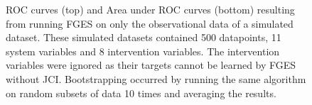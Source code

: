 \documentclass[a4paper,pdf]{article}
\begin{document}
\begin{figure}[!ht]
    \centering   
    \renewcommand{\arraystretch}{2}
    \setlength{\tabcolsep}{7pt}
    \caption{ROC curves (top) and Area under ROC curves (bottom) resulting from running FGES on only the observational data of a simulated dataset. These simulated datasets contained 500 datapoints, 11 system variables and 8 intervention variables. The intervention variables were ignored as their targets cannot be learned by FGES without JCI. Bootstrapping occurred by running the same algorithm on random subsets of data 10 times and averaging the results.\label{fig:obssimgraphfgesfull}}

\end{figure}
\end{document}
